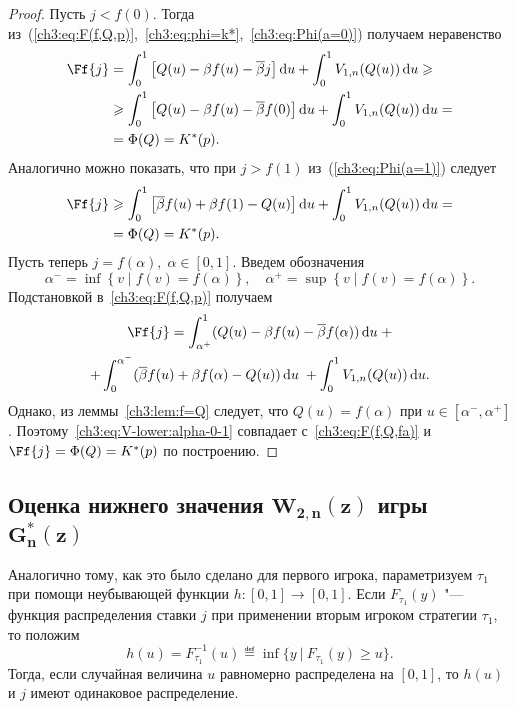 {\begin{proof}
  Пусть $j < f(0)$.
  Тогда из~(\ref{ch3:eq:F(f,Q,p)},~\ref{ch3:eq:phi=k*},~\ref{ch3:eq:Phi(a=0)}) получаем неравенство
  \begin{align*}
    \Ff{j} 
    &= \int_0^1 \left[ 
      Q(u) - \Co f(u) - \DCo j 
    \right] \di u +
    \int_0^1 V_{1,n}(Q(u)) \di u \geq \\
    &\geq \int_0^1 \left[ 
      Q(u) - \Co f(u) - \DCo f(0) 
    \right] \di u + \int_0^1 V_{1,n}(Q(u)) \di u = \\
    &= \Phi(Q) = K^*(p).
  \end{align*}
  Аналогично можно показать, что при $j > f(1)$ из~(\ref{ch3:eq:Phi(a=1)}) следует
  \begin{align*}
    \Ff{j} 
    &\geq \int_0^1 \left[ 
      \DCo f(u) + \Co f(1) - Q(u) 
    \right] \di u + \int_0^1 V_{1,n}(Q(u)) \di u = \\
    &= \Phi(Q) = K^*(p).
  \end{align*}
  Пусть теперь $j = f(\alpha), \; \alpha \in [0, 1]$. Введем обозначения
  \[
    \alpha^- = \inf \left\{ v \;|\; f(v) = f(\alpha) \right\}, \quad \alpha^+ =
    \sup \left\{ v \;|\; f(v) = f(\alpha) \right\}.
  \]
  Подстановкой в~\eqref{ch3:eq:F(f,Q,p)} получаем
  \begin{multline}\label{ch3:eq:V-lower:alpha-0-1}
    \Ff{j} =
    \int_{\alpha^+}^1  (Q(u) - \Co f(u) - \DCo f(\alpha)) \di u \; + \\
    + \int_0^{\alpha^-} (\DCo f(u) + \Co f(\alpha) - Q(u)) \di u \; + \int_0^1
    V_{1,n}(Q(u)) \di u.
  \end{multline}
  Однако, из леммы~\ref{ch3:lem:f=Q} следует, что $Q(u) = f(\alpha)$ при $u \in [\alpha^-, \alpha^+]$.
  Поэтому~\eqref{ch3:eq:V-lower:alpha-0-1} совпадает с~\eqref{ch3:eq:F(f,Q,fa)} и $\Ff{j} = \Phi(Q) = K^*(p)$ по построению.
\end{proof}

\subsection{Оценка нижнего значения $\mathbf{W_{2,n}(z)}$ игры $\mathbf{G^*_n(z)}$}
\label{ch3:sec:-dual-game}

Аналогично тому, как это было сделано для первого игрока, параметризуем $\tau_1$ при помощи неубывающей функции $h: [0, 1] \rightarrow [0, 1]$.
Если $F_{\tau_1}(y)$ "--- функция распределения ставки $j$ при применении вторым игроком стратегии $\tau_1$, то положим
\begin{equation*}
  h(u) = F^{-1}_{\tau_1}(u) \eqdef \inf \{ y\ |\ F_{\tau_1}(y) \geq u \}.
\end{equation*}
Тогда, если случайная величина $u$ равномерно распределена на $[0, 1]$, то $h(u)$ и $j$ имеют одинаковое распределение.

}
